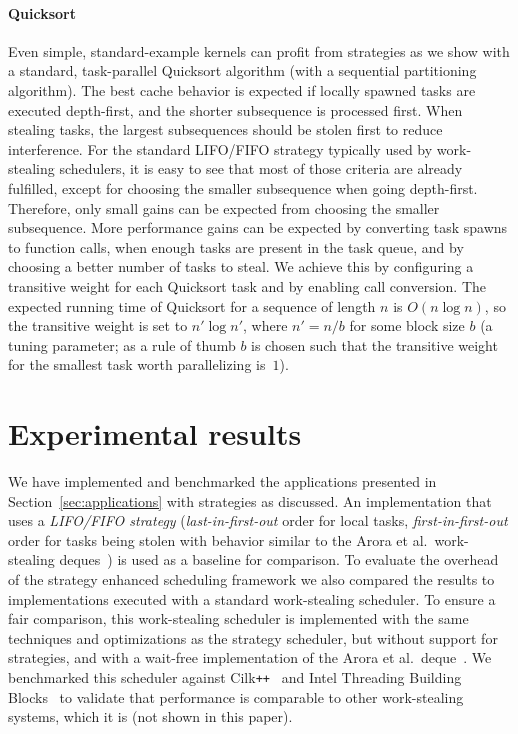 \documentclass[a4paper,11pt]{article}
\begin{document}
\paragraph{Quicksort}
\label{sec:qs}

Even simple, standard-example kernels can profit from strategies as we
show with a standard, task-parallel Quicksort algorithm (with a
sequential partitioning algorithm).  The best cache behavior is
expected if locally spawned tasks are executed depth-first, and the
shorter subsequence is processed first. When stealing tasks, the
largest subsequences should be stolen first to reduce interference.
For the standard LIFO/FIFO strategy typically used by work-stealing
schedulers, it is easy to see that most of those criteria are already
fulfilled, except for choosing the smaller subsequence when going
depth-first.  Therefore, only small gains can be expected from
choosing the smaller subsequence.  More performance gains can be
expected by converting task spawns to function calls, when enough
tasks are present in the task queue, and by choosing a better number
of tasks to steal. We achieve this by configuring a transitive weight
for each Quicksort task and by enabling call conversion. The expected
running time of Quicksort for a sequence of length $n$ is $O(n\log
n)$, so the transitive weight is set to $n'\log n'$, where $n'=n/b$
for some block size $b$ (a tuning parameter; as a rule of thumb $b$ is
chosen such that the transitive weight for the smallest task worth
parallelizing is~$1$).

\section{Experimental results}
\label{sec:results}

We have implemented and benchmarked the applications presented in
Section~\ref{sec:applications} with strategies as discussed.  An
implementation that uses a \emph{LIFO/FIFO strategy}
(\emph{last-in-first-out} order for local tasks,
\emph{first-in-first-out} order for tasks being stolen with behavior
similar to the Arora et al.\ work-stealing
deques~\cite{AroraBlumofePlaxton01}) is used as a baseline for
comparison.  To evaluate the overhead of the strategy enhanced
scheduling framework we also compared the results to implementations
executed with a standard work-stealing scheduler.  To ensure a fair
comparison, this work-stealing scheduler is implemented with the same
techniques and optimizations as the strategy scheduler, but without
support for strategies, and with a wait-free implementation of the
Arora et al.\ deque~\cite{AroraBlumofePlaxton01}. We benchmarked this
scheduler against Cilk\verb!++!~\cite{Leiserson10} and Intel Threading
Building Blocks~\cite{KukanovVoss07} to validate that performance is
comparable to other work-stealing systems, which it is (not shown in
this paper).
\end{document}
